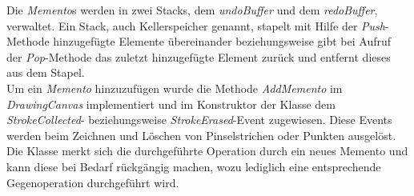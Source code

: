 Die \textit{Memento}s werden in zwei Stacks, dem \textit{undoBuffer} und dem \textit{redoBuffer}, verwaltet. Ein Stack, auch Kellerspeicher genannt, stapelt mit Hilfe der \textit{Push}-Methode hinzugefügte Elemente übereinander beziehungsweise gibt bei Aufruf der \textit{Pop}-Methode das zuletzt hinzugefügte Element zurück und entfernt dieses aus dem Stapel.\\
Um ein \textit{Memento} hinzuzufügen wurde die Methode \textit{AddMemento} im \textit{DrawingCanvas} implementiert und im Konstruktor der Klasse dem \textit{StrokeCollected}- beziehungsweise \textit{StrokeErased}-Event zugewiesen. Diese Events werden beim Zeichnen und Löschen von Pinselstrichen oder Punkten ausgelöst. Die Klasse merkt sich die durchgeführte Operation durch ein neues Memento und kann diese bei Bedarf rückgängig machen, wozu lediglich eine entsprechende Gegenoperation durchgeführt wird.
